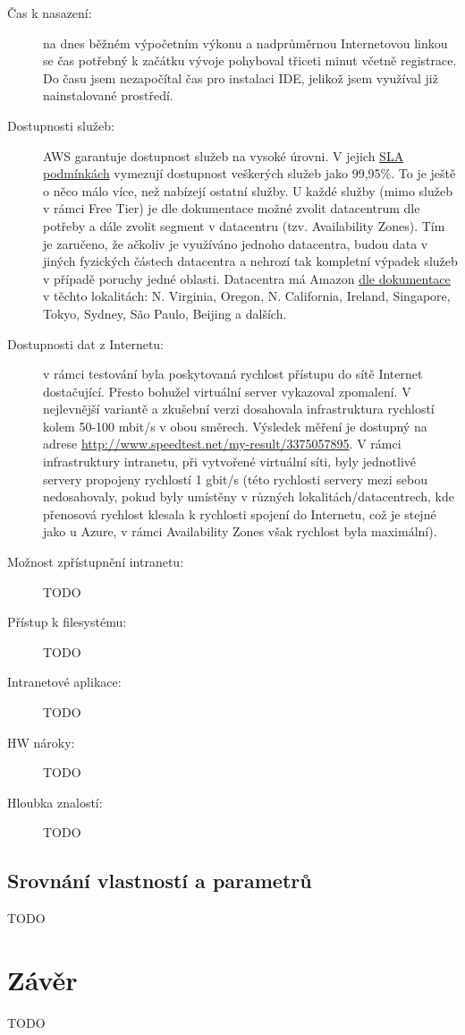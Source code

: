 \begin{description}
	\item [Čas k nasazení:] na dnes běžném výpočetním výkonu a nadprůměrnou Internetovou linkou se čas potřebný k začátku vývoje pohyboval třiceti minut včetně registrace. Do času jsem nezapočítal čas pro instalaci IDE, jelikož jsem využíval již nainstalované prostředí.
	\item [Dostupnosti služeb:] AWS garantuje dostupnost služeb na vysoké úrovni. V jejich \href{http://aws.amazon.com/ec2/sla/}{SLA podmínkách\cite{amazon:sla}} vymezují dostupnost veškerých služeb jako 99,95\%. To je ještě o něco málo více, než nabízejí ostatní služby. U každé služby (mimo služeb v rámci Free Tier) je dle dokumentace možné zvolit datacentrum dle potřeby a dále zvolit segment v datacentru (tzv. Availability Zones). Tím je zaručeno, že ačkoliv je využíváno jednoho datacentra, budou data v jiných fyzických částech datacentra a nehrozí tak kompletní výpadek služeb v případě poruchy jedné oblasti. Datacentra má Amazon \href{http://aws.amazon.com/about-aws/globalinfrastructure/regional-product-services/}{dle dokumentace\cite{amazon:locations}} v těchto lokalitách: N. Virginia, Oregon, N. California, Ireland, Singapore, Tokyo, Sydney, São Paulo, Beijing a dalších.
	\item [Dostupnosti dat z Internetu:] v rámci testování byla poskytovaná rychlost přístupu do sítě Internet dostačující. Přesto bohužel virtuální server vykazoval zpomalení. V nejlevnější variantě a zkušební verzi dosahovala infrastruktura rychlostí kolem 50-100 mbit/s v obou směrech. Výsledek měření je dostupný na adrese \href{http://www.speedtest.net/my-result/3375057895}{http://www.speedtest.net/my-result/3375057895}. V rámci infrastruktury intranetu, při vytvořené virtuální síti, byly jednotlivé servery propojeny rychlostí 1 gbit/s (této rychlosti servery mezi sebou nedosahovaly, pokud byly umístěny v různých lokalitách/datacentrech, kde přenosová rychlost klesala k rychlosti spojení do Internetu, což je stejné jako u Azure, v rámci Availability Zones však rychlost byla maximální).
	\item [Možnost zpřístupnění intranetu:] TODO
	\item [Přístup k filesystému:] TODO
	\item [Intranetové aplikace:] TODO
	\item [HW nároky:] TODO
	\item [Hloubka znalostí:] TODO
\end{description}

\subsection{Srovnání vlastností a parametrů}
TODO

\newpage
\section{Závěr}
TODO